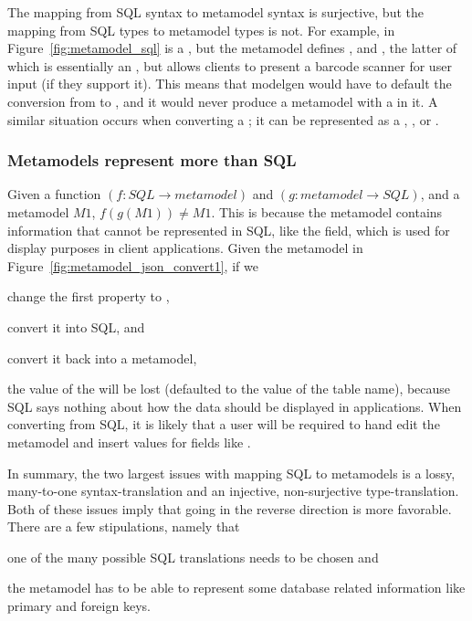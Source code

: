 The mapping from SQL syntax to metamodel syntax is surjective, but the
mapping from SQL types to metamodel types is not. For example,  in
Figure~\ref{fig:metamodel_sql} is a , but the metamodel defines
, and , the latter of which is essentially an
, but allows clients to present a barcode scanner for user input (if
they support it). This means that modelgen would have to default the conversion
from  to , and it would never produce a metamodel with
a  in it. A similar situation occurs when converting a
; it can be represented as a , , or
.


\subsubsection{Metamodels represent more than SQL}  \label{sec:}


Given a function $(f:SQL \rightarrow metamodel)$ and \mbox{$(g:metamodel
\rightarrow SQL)$}, and a metamodel $M1$, $f(g(M1)) \neq M1$.
This is because the metamodel contains information that cannot be
represented in SQL, like the  field, which is used for display
purposes in client applications. Given the metamodel in
Figure~\ref{fig:metamodel_json_convert1}, if we
\begin{inparaenum}
\item change the first  property to ,
\item convert it into SQL, and
\item convert it back into a metamodel,
\end{inparaenum}
the value of the  will be lost (defaulted to the value of the table
name), because SQL says nothing about how the data should be displayed in
applications. When converting from SQL, it is likely that a
user will be required to hand edit the metamodel and insert values for fields
like .

In summary, the two largest issues with mapping SQL to metamodels is a lossy,
many-to-one syntax-translation and an injective, non-surjective type-translation.
Both of these issues imply that going in the reverse direction is more
favorable. There are a few stipulations, namely that 
\begin{inparaenum} 
\item one of the many possible SQL translations needs to be chosen and
\item the metamodel has to be able to represent some database related information
like primary and foreign keys.
\end{inparaenum}

